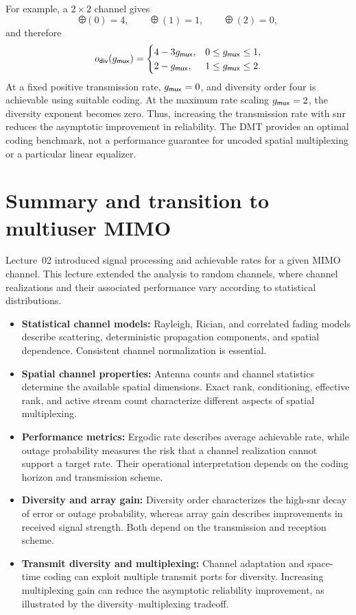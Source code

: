 For example, a $2\times2$ channel gives
\begin{equation*}
	\odiv(0)=4,\qquad
	\odiv(1)=1,\qquad
	\odiv(2)=0,
\end{equation*}
and therefore
\begin{equation*}
	o_{\mathsf{div}}(g_{\mathsf{mux}})=
	\begin{cases}
		4-3g_{\mathsf{mux}},
		&0\leq g_{\mathsf{mux}}\leq1,\\
		2-g_{\mathsf{mux}},
		&1\leq g_{\mathsf{mux}}\leq2.
	\end{cases}
\end{equation*}
%
At a fixed positive transmission rate, $g_{\mathsf{mux}}=0$, and diversity order four is achievable using suitable coding. At the maximum rate scaling $g_{\mathsf{mux}}=2$, the diversity exponent becomes zero.
%
Thus, increasing the transmission rate with \ac{snr} reduces the asymptotic improvement in reliability. The DMT provides an optimal coding benchmark, not a performance guarantee for uncoded spatial multiplexing or a particular linear equalizer.


\section{Summary and transition to multiuser MIMO}

Lecture~02 introduced signal processing and achievable rates for a given MIMO channel. This lecture extended the analysis to random channels, where channel realizations and their associated performance vary according to statistical distributions.

\begin{itemize}
	\item \textbf{Statistical channel models:} Rayleigh, Rician, and correlated fading models describe scattering, deterministic propagation components, and spatial dependence. Consistent channel normalization is essential.
	
	\item \textbf{Spatial channel properties:} Antenna counts and channel statistics determine the available spatial dimensions. Exact rank, conditioning, effective rank, and active stream count characterize different aspects of spatial multiplexing.
	
	\item \textbf{Performance metrics:} Ergodic rate describes average achievable rate, while outage probability measures the risk that a channel realization cannot support a target rate. Their operational interpretation depends on the coding horizon and transmission scheme.
	
	\item \textbf{Diversity and array gain:} Diversity order characterizes the high-\ac{snr} decay of error or outage probability, whereas array gain describes improvements in received signal strength. Both depend on the transmission and reception scheme.
	
	\item \textbf{Transmit diversity and multiplexing:} Channel adaptation and space-time coding can exploit multiple transmit ports for diversity. Increasing multiplexing gain can reduce the asymptotic reliability improvement, as illustrated by the diversity--multiplexing tradeoff.
\end{itemize}

